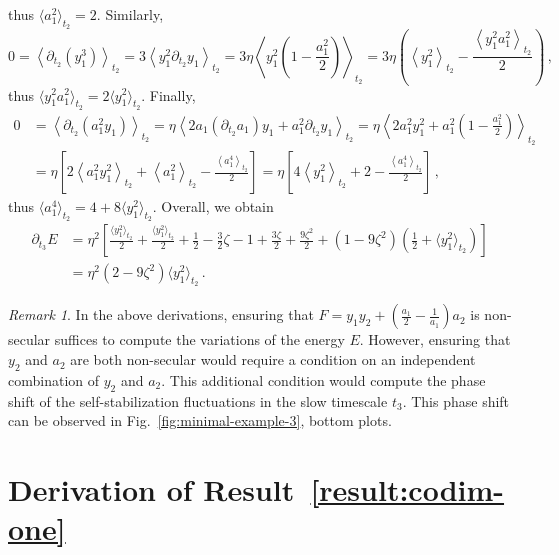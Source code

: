 \documentclass[11pt,english,reqno]{article}
\theoremstyle{plain}
\theoremstyle{definition}
\theoremstyle{remark}
\newtheorem{remark}[proposition]{Remark}
\numberwithin{equation}{section}
\begin{document}
thus $\langle a_1^2 \rangle_{t_2} = 2$. Similarly, 
\begin{equation*}
    0 = \left\langle \partial_{t_2} (y_1^3) \right\rangle_{t_2} = 3 \left\langle y_1^2 \partial_{t_2} y_1 \right\rangle_{t_2} = 3 \eta \left\langle y_1^2 \left(1 - \frac{a_1^2}{2}\right)\right\rangle_{t_2} = 3\eta \left(\left\langle y_1^2 \right\rangle_{t_2} - \frac{\left\langle y_1^2 a_1^2 \right\rangle_{t_2}}{2}\right) \, ,
\end{equation*}
thus $\langle y_1^2 a_1^2 \rangle_{t_2} = 2 \langle y_1^2 \rangle_{t_2}$. Finally, 
\begin{align*}
    0 &= \left\langle \partial_{t_2} (a_1^2 y_1) \right\rangle_{t_2} = \eta \left\langle 2 a_1 (\partial_{t_2} a_1) y_1 + a_1^2 \partial_{t_2} y_1 \right\rangle_{t_2} = \eta \left\langle 2 a_1^2y_1^2 + a_1^2 \left(1 - \frac{a_1^2}{2}\right) \right\rangle_{t_2} \\
    &= \eta \left[2 \left\langle a_1^2 y_1^2 \right\rangle_{t_2} + \left\langle a_1^2  \right\rangle_{t_2} - \frac{\left\langle a_1^4 \right\rangle_{t_2}}{2}\right] = \eta \left[4 \left\langle y_1^2 \right\rangle_{t_2} + 2 - \frac{\left\langle a_1^4 \right\rangle_{t_2}}{2}\right]\, ,
\end{align*}
thus $\langle a_1^4 \rangle_{t_2} = 4 + 8 \langle y_1^2 \rangle_{t_2}$. Overall, we obtain 
\begin{align*}
    \partial_{t_3} E &= \eta^2 \left[ \frac{\langle y_1^2 \rangle_{t_2}}{2} + \frac{\langle y_1^2 \rangle_{t_2}}{2} + \frac{1}{2} - \frac{3}{2} \zeta  -1 + \frac{3\zeta}{2} + \frac{9 \zeta^2}{2} + (1 - 9 \zeta^2) \left(\frac{1}{2} + \langle y_1^2 \rangle_{t_2}\right) \right] \\
    &= \eta^2 (2 - 9 \zeta^2) \langle y_1^2 \rangle_{t_2}  \, .
\end{align*}

\begin{remark}
    In the above derivations, ensuring that $F = y_1 y_2 + \left(\frac{a_1}{2}-\frac{1}{a_1}\right) a_2$ is non-secular suffices to compute the variations of the energy $E$. However, ensuring that $y_2$ and $a_2$ are both non-secular would require a condition on an independent combination of $y_2$ and $a_2$. This additional condition would compute the phase shift of the self-stabilization fluctuations in the slow timescale $t_3$. This phase shift can be observed in Fig.~\ref{fig:minimal-example-3}, bottom plots. 
\end{remark}

\section{Derivation of Result~\ref{result:codim-one}}
\label{sec:derivation-codim-one}
\end{document}
